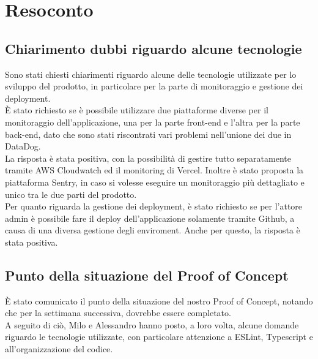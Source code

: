 \section{Resoconto}
\subsection{Chiarimento dubbi riguardo alcune tecnologie}

Sono stati chiesti chiarimenti riguardo alcune delle tecnologie utilizzate per lo sviluppo del prodotto, in particolare per la parte di monitoraggio e gestione dei deployment.\\

È stato richiesto se è possibile utilizzare due piattaforme diverse per il monitoraggio dell'applicazione, una per la parte front-end e l'altra per la parte back-end, dato che sono stati riscontrati vari problemi nell'unione dei due in DataDog. \\
La risposta è stata positiva, con la possibilità di gestire tutto separatamente tramite AWS Cloudwatch ed il monitoring di Vercel. Inoltre è stato proposta la piattaforma Sentry, in caso si volesse eseguire un monitoraggio più dettagliato e unico tra le due parti del prodotto.\\

Per quanto riguarda la gestione dei deployment, è stato richiesto se per l'attore admin è possibile fare il deploy dell'applicazione solamente tramite Github, a causa di una diversa gestione degli enviroment. Anche per questo, la risposta è stata positiva.
  
\subsection{Punto della situazione del Proof of Concept}

È stato comunicato il punto della situazione del nostro Proof of Concept, notando che per la settimana successiva, dovrebbe essere completato. \\A seguito di ciò, Milo e Alessandro hanno posto, a loro volta, alcune domande riguardo le tecnologie utilizzate, con particolare attenzione a ESLint, Typescript e all'organizzazione del codice.
